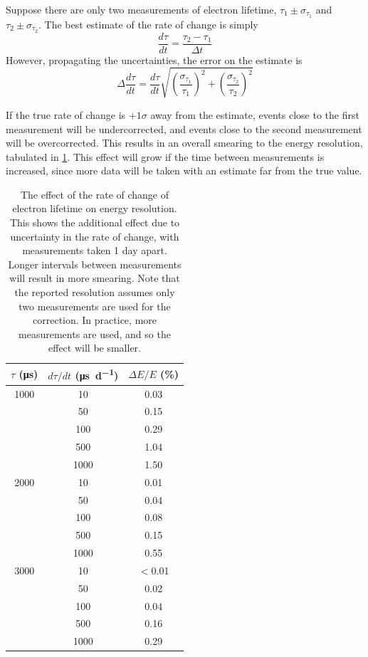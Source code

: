 \documentclass[herrin-thesis.tex]{subfiles}
\begin{document}
Suppose there are only two measurements of electron lifetime, \(\tau_1 \pm \sigma_{\tau_1}\) and \(\tau_2 \pm \sigma_{\tau_2}\). The best estimate of the rate of change is simply
\[\frac{d\tau}{dt} = \frac{\tau_2 - \tau_1}{\Delta t}\]
However, propagating the uncertainties, the error on the estimate is
\[\Delta \frac{d\tau}{dt} = \frac{d\tau}{dt}\sqrt{\left(\frac{\sigma_{\tau_1}}{\tau_1}\right)^2 + \left(\frac{\sigma_{\tau_2}}{\tau_2}\right)^2}\]

If the true rate of change is \(+1\sigma\) away from the estimate, events close to the first measurement will be undercorrected, and events close to the second measurement will be overcorrected. This results in an overall smearing to the energy resolution, tabulated in \cref{tab:el_res_dtaudt}. This effect will grow if the time between measurements is increased, since more data will be taken with an estimate far from the true value.

\begin{table}[tbp]
\centering
\caption[Effect of electron lifetime time variance on resolution]{The effect of the rate of change of electron lifetime on energy resolution. This shows the additional effect due to uncertainty in the rate of change, with measurements taken 1 day apart. Longer intervals between measurements will result in more smearing. Note that the reported resolution assumes only two measurements are used for the correction. In practice, more measurements are used, and so the effect will be smaller.}
\label{tab:el_res_dtaudt}
\begin{tabular}{c c c}\toprule
	\(\tau\) (\si{\micro\second})	&	\(d\tau/dt\) (\si{\micro\second\per\day})	&	\(\Delta E / E\) (\%) 	\\\midrule
	1000					&	10			&	0.03				\\
						&	50			&	0.15				\\
						&	100			&	0.29				\\
						&	500			&	1.04				\\
						&	1000			&	1.50				\\\midrule
	2000					&	10			&	0.01				\\
						&	50			&	0.04				\\
						&	100			&	0.08				\\
						&	500			&	0.15				\\
						&	1000			&	0.55				\\\midrule
	3000					&	10			&	\(<\)0.01			\\
						&	50			&	0.02				\\
						&	100			&	0.04				\\
						&	500			&	0.16				\\
						&	1000			&	0.29				\\\bottomrule
\end{tabular}
\end{table}
\end{document}
